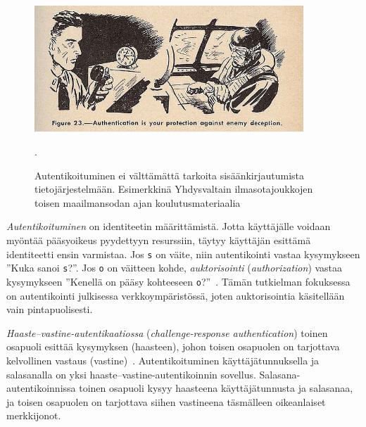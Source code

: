 \documentclass[finnish,gradu]{tktltiki}
\begin{document}
  \begin{figure}[h!]
    \centering
    \includegraphics[width=0.9\textwidth]{images/usnavy_authentication.jpg}
    \caption{Autentikoituminen ei välttämättä tarkoita sisäänkirjautumista tietojärjestelmään. Esimerkkinä Yhdysvaltain ilmasotajoukkojen toisen maailmansodan ajan koulutusmateriaalia~\cite{usnavy_authentication}}.
    \label{fig:autentikointi_suojaa_viholliselta}
  \end{figure}


  \emph{Autentikoituminen} on identiteetin määrittämistä. Jotta käyttäjälle voidaan myöntää pääsyoikeus pyydettyyn resurssiin, täytyy käyttäjän esittämä identiteetti ensin varmistaa. Jos \verb#s# on väite, niin autentikointi vastaa kysymykseen ''Kuka sanoi \verb#s#?''. Jos \verb#o# on väitteen kohde, \emph{auktorisointi} (\emph{authorization}) vastaa kysymykseen ''Kenellä on pääsy kohteeseen \verb#o#?''~\cite{lampson_distributed_1992}. Tämän tutkielman fokuksessa on autentikointi julkisessa verkkoympäristössä, joten auktorisointia käsitellään vain pintapuolisesti.

  \emph{Haaste--vastine-autentikaatiossa} (\emph{challenge-response authentication}) toinen osapuoli esittää kysymyksen (haasteen), johon toisen osapuolen on tarjottava kelvollinen vastaus (vastine)~\cite{NIST_SP800-63-1}. Autentikoituminen käyttäjätunnuksella ja salasanalla on yksi haaste--vastine-autentikoinnin sovellus. Salasana-autentikoinnissa toinen osapuoli kysyy haasteena käyttäjätunnusta ja salasanaa, ja toisen osapuolen on tarjottava siihen vastineena täsmälleen oikeanlaiset merkkijonot.


\end{document}
